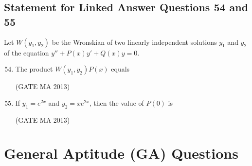 \documentclass[journal,12pt,onecolumn]{IEEEtran}
\theoremstyle{remark}
\begin{document}
\subsection*{Statement for Linked Answer Questions 54 and 55}
Let $W(y_1, y_2)$ be the Wronskian of two linearly independent solutions $y_1$ and $y_2$ of the equation $y'' + P(x)y' + Q(x)y = 0$.
\begin{enumerate}
    \setcounter{enumi}{53}
    \item The product $W(y_1, y_2)P(x)$ equals
    \begin{enumerate}
    \end{enumerate}
    \hfill (GATE MA 2013)
    \item If $y_1 = e^{2x}$ and $y_2 = x e^{2x}$, then the value of $P(0)$ is
    \begin{enumerate}
    \end{enumerate}
    \hfill (GATE MA 2013)
\end{enumerate}
\section*{General Aptitude (GA) Questions}
\end{document}
